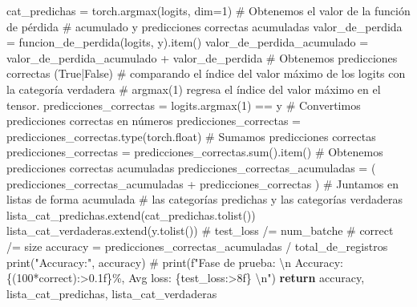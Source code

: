 \documentclass[
  10pt,
]{article}
\newenvironment{Shaded}{\begin{snugshade}}{\end{snugshade}}
\newcommand{\BuiltInTok}[1]{\textcolor[rgb]{0.00,0.23,0.31}{#1}}
\newcommand{\CommentTok}[1]{\textcolor[rgb]{0.37,0.37,0.37}{#1}}
\newcommand{\ControlFlowTok}[1]{\textcolor[rgb]{0.00,0.23,0.31}{\textbf{#1}}}
\newcommand{\DecValTok}[1]{\textcolor[rgb]{0.68,0.00,0.00}{#1}}
\newcommand{\NormalTok}[1]{\textcolor[rgb]{0.00,0.23,0.31}{#1}}
\newcommand{\OperatorTok}[1]{\textcolor[rgb]{0.37,0.37,0.37}{#1}}
\newcommand{\StringTok}[1]{\textcolor[rgb]{0.13,0.47,0.30}{#1}}
\begin{document}
\begin{Shaded}
\begin{Highlighting}[]
\NormalTok{            cat\_predichas }\OperatorTok{=}\NormalTok{ torch.argmax(logits, dim}\OperatorTok{=}\DecValTok{1}\NormalTok{)}
            \CommentTok{\# Obtenemos el valor de la función de pérdida}
            \CommentTok{\# acumulado y predicciones correctas acumuladas}
\NormalTok{            valor\_de\_perdida }\OperatorTok{=}\NormalTok{ funcion\_de\_perdida(logits, y).item()}
\NormalTok{            valor\_de\_perdida\_acumulado }\OperatorTok{=}\NormalTok{ valor\_de\_perdida\_acumulado }\OperatorTok{+}\NormalTok{ valor\_de\_perdida}
            \CommentTok{\# Obtenemos predicciones correctas (True|False)}
            \CommentTok{\# comparando el índice del valor máximo de los logits con la categoría verdadera}
            \CommentTok{\# argmax(1) regresa el índice del valor máximo en el tensor.}
\NormalTok{            predicciones\_correctas }\OperatorTok{=}\NormalTok{ logits.argmax(}\DecValTok{1}\NormalTok{) }\OperatorTok{==}\NormalTok{ y}
            \CommentTok{\# Convertimos predicciones correctas en números}
\NormalTok{            predicciones\_correctas }\OperatorTok{=}\NormalTok{ predicciones\_correctas.}\BuiltInTok{type}\NormalTok{(torch.}\BuiltInTok{float}\NormalTok{)}
            \CommentTok{\# Sumamos predicciones correctas}
\NormalTok{            predicciones\_correctas }\OperatorTok{=}\NormalTok{ predicciones\_correctas.}\BuiltInTok{sum}\NormalTok{().item()}
            \CommentTok{\# Obtenemos predicciones correctas acumuladas}
\NormalTok{            predicciones\_correctas\_acumuladas }\OperatorTok{=}\NormalTok{ (}
\NormalTok{                predicciones\_correctas\_acumuladas }\OperatorTok{+}\NormalTok{ predicciones\_correctas}
\NormalTok{            )}
            \CommentTok{\# Juntamos en listas de forma acumulada}
            \CommentTok{\# las categorías predichas y las categorías verdaderas}
\NormalTok{            lista\_cat\_predichas.extend(cat\_predichas.tolist())}
\NormalTok{            lista\_cat\_verdaderas.extend(y.tolist())}
    \CommentTok{\# test\_loss /= num\_batche}
    \CommentTok{\# correct /= size}
\NormalTok{    accuracy }\OperatorTok{=}\NormalTok{ predicciones\_correctas\_acumuladas }\OperatorTok{/}\NormalTok{ total\_de\_registros}
    \BuiltInTok{print}\NormalTok{(}\StringTok{"Accuracy:"}\NormalTok{, accuracy)}
    \CommentTok{\# print(f"Fase de prueba: \textbackslash{}n Accuracy: \{(100*correct):\textgreater{}0.1f\}\%, Avg loss: \{test\_loss:\textgreater{}8f\} \textbackslash{}n")}
    \ControlFlowTok{return}\NormalTok{ accuracy, lista\_cat\_predichas, lista\_cat\_verdaderas}
\end{Highlighting}
\end{Shaded}
\end{document}
